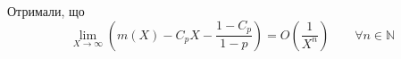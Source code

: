 Отримали, що
\begin{equation}
\label{eq:uniform_right_as_enhanced}
\lim\limits_{X \rightarrow \infty} \left( m(X) - C_{p} X - \frac{1 - C_{p}}{1 - p} \right) = O\left(\frac{1}{X^{n}}\right) \qquad \forall n \in \mathbb{N}
\end{equation}
